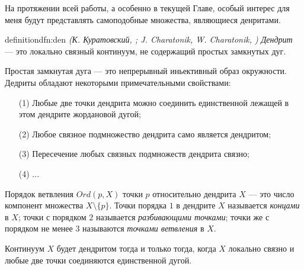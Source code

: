 %

На протяжении всей работы, а особенно в текущей Главе, особый интерес для меня будут представлять самоподобные множества, являющиеся денритами. 

\begin{restatethis}{definition}{dfn:den} %
{\em (К. Куратовский, \cite{Kur}; J. Charatonik, W. Charatonik, \cite{Char})}
{\em Дендрит} --- это локально связный континуум, не содержащий простых замкнутых дуг.     
\end{restatethis}

Простая замкнутая дуга --- это непрерывный иньективный образ окружности.
Дедриты обладают некоторыми примечательными свойствами:
\begin{enumerate}[nolistsep]
\item[(1)] Любые две точки дендрита можно соединить единственной лежащей в этом дендрите жордановой дугой;
\item[(2)] Любое связное подмножество дендрита само является дендритом;
\item[(3)] Пересечение любых связных подмножеств дендрита связно;
\item[(4)] ...
\end{enumerate}

Порядок ветвления $Ord(p,X)$ точки $p$ относительно дендрита $X$ --- это число компонент множества $X\setminus\{p\}$.
Точки порядка $1$ в дендрите $X$ называется {\em концами} в $X$; точки с порядком  $2$ называется {\em разбивающими точками}; точки же с порядком не менее $3$ называются {\em точками ветвления} в $X$.

Континуум $X$ будет дендритом тогда и только тогда, когда $X$ локально связно и  любые две точки соединяются единственной дугой. \\

